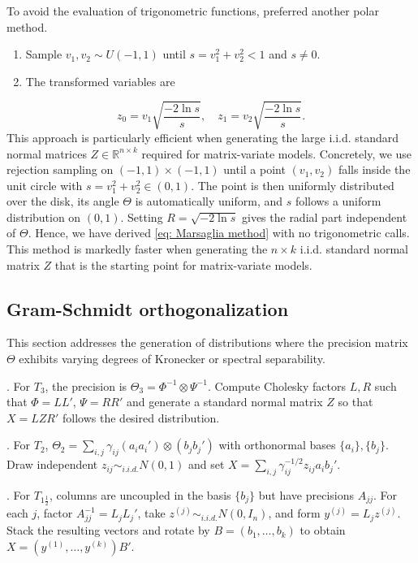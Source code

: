 \documentclass{amsart}
\theoremstyle{definition}
\numberwithin{equation}{section}
\begin{document}
To avoid the evaluation of trigonometric functions, \cite{marsaglia1964convenient} preferred another polar method.
\begin{enumerate}
    \item Sample $v_1, v_2 \sim U(-1, 1)$ until $s = v_1^2 + v_2^2 < 1$ and $s \neq 0$.
    \item The transformed variables are
\end{enumerate}
\begin{equation}
    z_0 = v_1 \sqrt{\frac{-2 \ln s}{s}}, \quad z_1 = v_2 \sqrt{\frac{-2 \ln s}{s}}. \label{eq: Marsaglia method}
\end{equation}
This approach is particularly efficient when generating the large i.i.d. standard normal matrices $Z \in \mathbb{R}^{n \times k}$ required for matrix-variate models. Concretely, we use rejection sampling on \((-1,1)\times(-1,1)\) until a point \((v_1,v_2)\) falls inside the unit circle with \(s=v_1^2+v_2^2\in(0,1)\).  The point is then uniformly distributed over the disk, its angle \(\Theta\) is automatically uniform, and \(s\) follows a uniform distribution on \((0,1)\).  Setting \(R=\sqrt{-2\ln s}\) gives the radial part independent of \(\varTheta\). Hence, we have derived \eqref{eq: Marsaglia method} with no trigonometric calls. This method is markedly faster when generating the \(n\times k\) i.i.d. standard normal matrix \(Z\) that is the starting point for matrix-variate models.

\subsection{Gram-Schmidt orthogonalization}
This section addresses the generation of distributions where the precision matrix $\varTheta$ exhibits varying degrees of Kronecker or spectral separability.

. For \(T_3\), the precision is \(\varTheta_3 = \varPhi^{-1}\otimes\varPsi^{-1}\).  Compute Cholesky factors \(L,R\) such that \(\varPhi = LL'\), \(\varPsi = RR'\) and generate a standard normal matrix \(Z\) so that \(X = L Z R'\) follows the desired distribution.  

. For \(T_2\), \(\varTheta_2 = \sum_{i,j}\gamma_{ij}(a_i a_i')\otimes(b_j b_j')\) with orthonormal bases \(\{a_i\},\{b_j\}\).  Draw independent \(z_{ij}\sim_{i.i.d.} N(0,1)\) and set \(X = \sum_{i,j}\gamma_{ij}^{-1/2}z_{ij}a_i b_j'\).  

. For \(T_{1\frac{1}{2}}\), columns are uncoupled in the basis \(\{b_j\}\) but have precisions \(A_{jj}\).  For each \(j\), factor \(A_{jj}^{-1} = L_j L_j'\), take \(z^{(j)}\sim_{i.i.d.} N(0,I_n)\), and form \(y^{(j)} = L_j z^{(j)}\).  Stack the resulting vectors and rotate by \(B=(b_1,\dots,b_k)\) to obtain \(X = (y^{(1)},\dots,y^{(k)})B'\).
\end{document}
